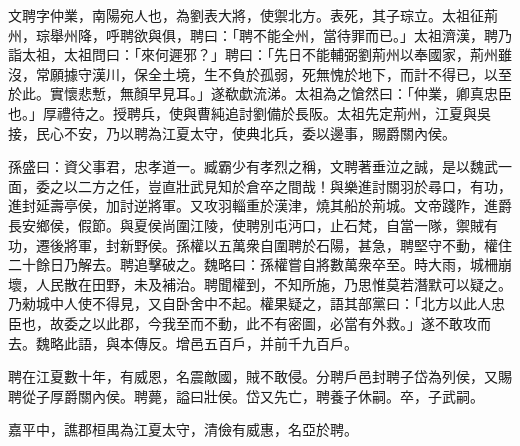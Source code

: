 
\begin{pinyinscope}
文聘字仲業，南陽宛人也，為劉表大將，使禦北方。表死，其子琮立。太祖征荊州，琮舉州降，呼聘欲與俱，聘曰：「聘不能全州，當待罪而已。」太祖濟漢，聘乃詣太祖，太祖問曰：「來何遲邪？」聘曰：「先日不能輔弼劉荊州以奉國家，荊州雖沒，常願據守漢川，保全土境，生不負於孤弱，死無愧於地下，而計不得已，以至於此。實懷悲慙，無顏早見耳。」遂欷歔流涕。太祖為之愴然曰：「仲業，卿真忠臣也。」厚禮待之。授聘兵，使與曹純追討劉備於長阪。太祖先定荊州，江夏與吳接，民心不安，乃以聘為江夏太守，使典北兵，委以邊事，賜爵關內侯。

孫盛曰：資父事君，忠孝道一。臧霸少有孝烈之稱，文聘著垂泣之誠，是以魏武一面，委之以二方之任，豈直壯武見知於倉卒之間哉！與樂進討關羽於尋口，有功，進封延壽亭侯，加討逆將軍。又攻羽輜重於漢津，燒其船於荊城。文帝踐阼，進爵長安鄉侯，假節。與夏侯尚圍江陵，使聘別屯沔口，止石梵，自當一隊，禦賊有功，遷後將軍，封新野侯。孫權以五萬衆自圍聘於石陽，甚急，聘堅守不動，權住二十餘日乃解去。聘追擊破之。魏略曰：孫權嘗自將數萬衆卒至。時大雨，城柵崩壞，人民散在田野，未及補治。聘聞權到，不知所施，乃思惟莫若潛默可以疑之。乃勑城中人使不得見，又自卧舍中不起。權果疑之，語其部黨曰：「北方以此人忠臣也，故委之以此郡，今我至而不動，此不有密圖，必當有外救。」遂不敢攻而去。魏略此語，與本傳反。增邑五百戶，并前千九百戶。

聘在江夏數十年，有威恩，名震敵國，賊不敢侵。分聘戶邑封聘子岱為列侯，又賜聘從子厚爵關內侯。聘薨，謚曰壯侯。岱又先亡，聘養子休嗣。卒，子武嗣。

嘉平中，譙郡桓禺為江夏太守，清儉有威惠，名亞於聘。


\end{pinyinscope}